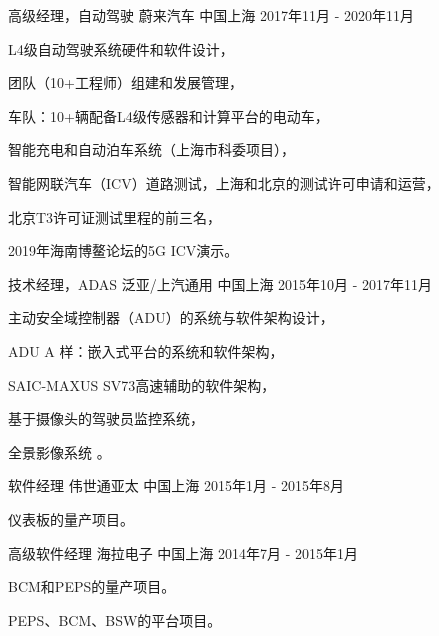 \documentclass[../cv_cn.tex]{subfiles}
\begin{document}
\begin{cventries}
  \cventry
    {高级经理，自动驾驶} %
    {蔚来汽车} %
    {中国上海} %
    {2017年11月 - 2020年11月} %
    {
      \begin{cvitems}
        \item L4级自动驾驶系统硬件和软件设计，
        \item 团队（10+工程师）组建和发展管理，
        \item 车队：10+辆配备L4级传感器和计算平台的电动车，
        \item 智能充电和自动泊车系统（上海市科委项目），
        \item 智能网联汽车（ICV）道路测试，上海和北京的测试许可申请和运营，
        \item 北京T3许可证测试里程的前三名，
        \item 2019年海南博鳌论坛的5G ICV演示。
      \end{cvitems}
    }

  \cventry
    {技术经理，ADAS} %
    {泛亚/上汽通用} %
    {中国上海} %
    {2015年10月 - 2017年11月} %
    {
      \begin{cvitems}
        \item 主动安全域控制器（ADU）的系统与软件架构设计，
        \item ADU A 样：嵌入式平台的系统和软件架构，
        \item SAIC-MAXUS SV73高速辅助的软件架构，
        \item 基于摄像头的驾驶员监控系统，
        \item 全景影像系统 \supercite{Xin_RearView_17}。
      \end{cvitems}
    }


  \cventry
    {软件经理} %
    {伟世通亚太} %
    {中国上海} %
    {2015年1月 - 2015年8月} %
    {
      \begin{cvitems}
        \item 仪表板的量产项目。
      \end{cvitems}
    }

  \cventry
    {高级软件经理} %
    {海拉电子} %
    {中国上海} %
    {2014年7月 - 2015年1月} %
    {
      \begin{cvitems}
        \item BCM和PEPS的量产项目。
        \item PEPS、BCM、BSW的平台项目。
      \end{cvitems}
    }


\end{cventries}
\end{document}
